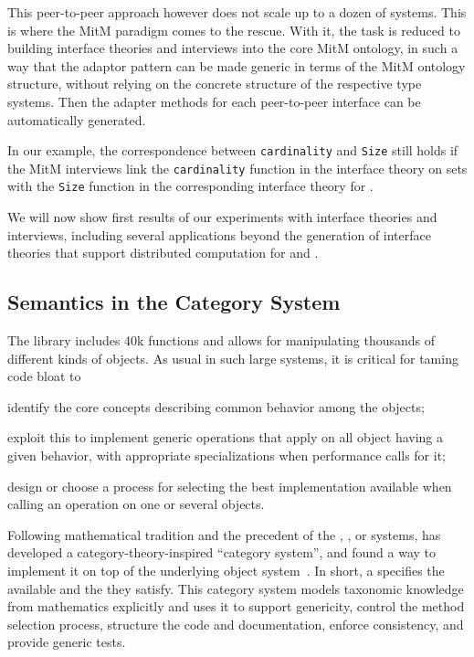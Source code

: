 This peer-to-peer approach however does not scale up to a dozen of
systems. This is where the MitM paradigm comes to the rescue. With it,
the task is reduced to building interface theories and interviews into
the core MitM ontology, in such a way that the adaptor pattern can be
made generic in terms of the MitM ontology structure, without relying
on the concrete structure of the respective type systems. Then the
adapter methods for each peer-to-peer interface can be automatically
generated.

In our example, the correspondence between \texttt{cardinality} and
\texttt{Size} still holds if the MitM interviews link the
\texttt{cardinality} function in the \Sage interface theory on sets
with the \texttt{Size} function in the corresponding interface theory
for \GAP.

We will now show first results of our experiments with interface
theories and interviews, including several applications beyond the
generation of interface theories that support distributed computation
for \Sage and \GAP.

\subsection{Semantics in the \Sage Category System}

The \Sage library includes 40k functions and allows for manipulating
thousands of different kinds of objects. As usual in such large
systems, it is critical for taming code bloat to
\begin{compactenum}[\em i\rm)]
\item identify the core concepts describing common behavior among the objects;
\item exploit this to implement generic operations that apply on all object having a given
  behavior, with appropriate specializations when performance calls for it;
\item design or choose a process for selecting the best implementation available when
  calling an operation on one or several objects.
\end{compactenum}

Following mathematical tradition and the precedent of the \Axiom,
\Fricas, or \MuPAD systems, \Sage has developed a
category-theory-inspired ``category system'', and found a way to
implement it on top of the underlying \Python object
system~\cite{Sage,Sage.Categories}. In short, a  specifies
the available  and the  they satisfy.
%
This category system models taxonomic knowledge from mathematics
explicitly and uses it to support genericity, control the method
selection process, structure the code and documentation, enforce
consistency, and provide generic tests.

